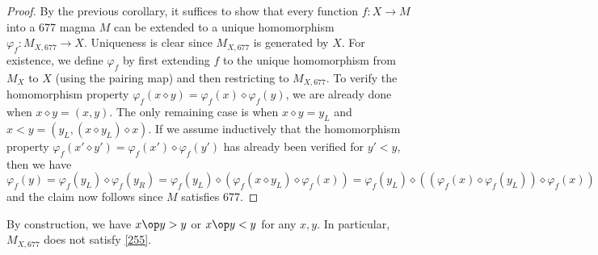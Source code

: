 \begin{proof}  By the previous corollary, it suffices to show that every function $f: X \to M$ into a 677 magma $M$ can be extended to a unique homomorphism $\varphi_f: M_{X,677} \to X$. Uniqueness is clear since $M_{X,677}$ is generated by $X$.  For existence, we define $\varphi_f$ by first extending $f$ to the unique homomorphism from $M_X$ to $X$ (using the pairing map) and then restricting to $M_{X,677}$.  To verify the homomorphism property $\varphi_f(x \diamond y) = \varphi_f(x) \diamond \varphi_f(y)$, we are already done when $x \diamond y = (x,y)$. The only remaining case is when $x \diamond y = y_L$ and $x < y = (y_L,  (x \diamond y_L) \diamond x)$.   If we assume inductively that the homomorphism property $\varphi_f(x' \diamond y') = \varphi_f(x') \diamond \varphi_f(y')$ has already been verified for $y' < y$, then we have
  $$ \varphi_f(y) = \varphi_f(y_L) \diamond \varphi_f(y_R) = \varphi_f(y_L) \diamond (\varphi_f(x \diamond y_L) \diamond \varphi_f(x)) =  \varphi_f(y_L) \diamond ((\varphi_f(x) \diamond \varphi_f(y_L)) \diamond \varphi_f(x))$$
  and the claim now follows since $M$ satisfies 677.
\end{proof}

By construction, we have $x \op y > y$ or $x \op y < y$ for any $x,y$.  In particular, $M_{X,677}$ does not satisfy \eqref{255}.
